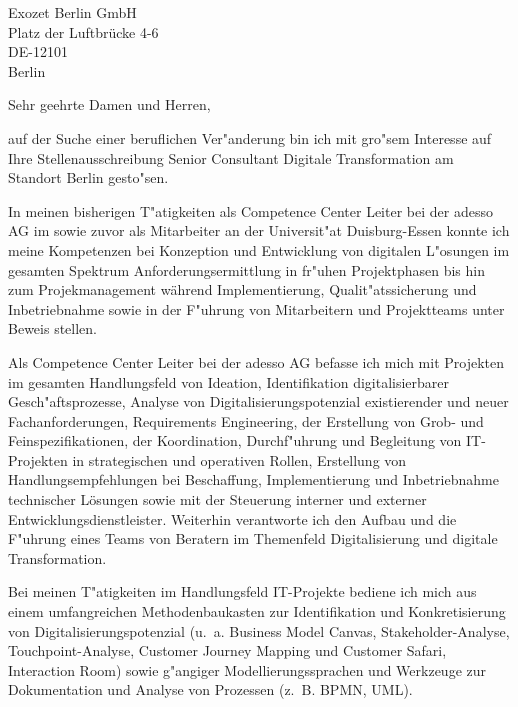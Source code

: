\documentclass[11pt,a4paper]{dinbrief}
\date{\today}
\begin{document}
 
\begin{letter}  
{%
	Exozet Berlin GmbH\\
	Platz der Luftbrücke 4-6\\
	DE-12101\\
	Berlin
}
\subject{\bf Bewerbung Senior Consultant Digitale Transformation}
\opening{Sehr geehrte Damen und Herren,}
auf der Suche einer beruflichen Ver"anderung bin ich mit gro"sem Interesse auf Ihre Stellenausschreibung Senior Consultant Digitale Transformation am Standort Berlin  gesto"sen. 

In meinen bisherigen T"atigkeiten als Competence Center Leiter bei der adesso AG im sowie zuvor als Mitarbeiter an der Universit"at Duisburg-Essen konnte ich meine Kompetenzen bei Konzeption und Entwicklung von digitalen L"osungen im gesamten Spektrum Anforderungsermittlung in fr"uhen Projektphasen bis hin zum Projekmanagement während Implementierung, Qualit"atssicherung und Inbetriebnahme sowie in der F"uhrung von Mitarbeitern und Projektteams unter Beweis stellen.


Als Competence Center Leiter bei der adesso AG befasse ich mich mit Projekten im gesamten Handlungsfeld von Ideation, Identifikation digitalisierbarer Gesch"aftsprozesse, Analyse von Digitalisierungspotenzial existierender und neuer Fachanforderungen, Requirements Engineering, der Erstellung von Grob- und Feinspezifikationen, der Koordination, Durchf"uhrung und Begleitung von IT-Projekten in strategischen und operativen Rollen, Erstellung von Handlungsempfehlungen bei Beschaffung, Implementierung und Inbetriebnahme technischer Lösungen sowie mit der Steuerung interner und externer Entwicklungsdienstleister. Weiterhin verantworte ich den Aufbau und die F"uhrung eines Teams von Beratern im Themenfeld Digitalisierung und digitale Transformation.

Bei meinen T"atigkeiten im Handlungsfeld IT-Projekte bediene ich mich aus einem umfangreichen Methodenbaukasten zur Identifikation und Konkretisierung von Digitalisierungspotenzial (u.~a. Business Model Canvas, Stakeholder-Analyse, Touchpoint-Analyse, Customer Journey Mapping und Customer Safari, Interaction Room) sowie g"angiger Modellierungssprachen und Werkzeuge zur Dokumentation und Analyse von Prozessen (z.~B. BPMN, UML).


\end{letter}
\end{document}
